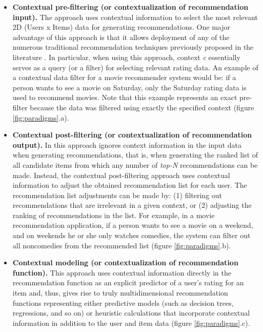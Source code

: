 \begin{itemize}
\item \textbf{Contextual pre-filtering (or contextualization of
recommendation input).} The approach uses contextual information to
select the most relevant 2D (Users x Items) data for generating
recommendations. One major advantage of this approach is that it
allows deployment of any of the numerous traditional recommendation
techniques previously proposed in the literature \cite{adomavicius2005toward}.
In particular, when using this approach, context
\textit{c} essentially serves as a query (or a filter) for selecting
relevant rating data. An example of a contextual data filter for a
movie recommender system would be: if a person wants to see a movie on
Saturday, only the Saturday rating data is used to recommend movies.
Note that this example represents an exact pre-filter because the data
was filtered using exactly the specified context (figure
\ref{fig:paradigms}.a).
\item \textbf{Contextual post-filtering (or contextualization of
recommendation output).} In this approach ignores context information
in the input data when generating recommendations, that is, when
generating the ranked list of all candidate items from which any
number of \textit{top-N} recommendations can be made. Instead,  the
contextual post-filtering approach uses contextual information to
adjust the obtained recommendation list for each user. The
recommendation list adjustments can be made by: (1) filtering out
recommendations that are irrelevant in a given context, or (2)
adjusting the ranking of recommendations in the list. For example, in
a movie recommendation application, if a person wants to see a movie
on a weekend, and on weekends he or she only watches comedies, the
system can filter out all noncomedies from the recommended list
(figure \ref{fig:paradigms}.b).
\item \textbf{Contextual modeling (or contextualization of
recommendation function).} This approach uses contextual information
directly in the recommendation function as an explicit predictor of a
user's rating for an item and, thus, gives rise to truly
multidimensional recommendation functions representing either
predictive models (such as decision trees, regressions, and so on) or
heuristic calculations that incorporate contextual information in
addition to the user and item data (figure \ref{fig:paradigms}.c).\\
\end{itemize}
